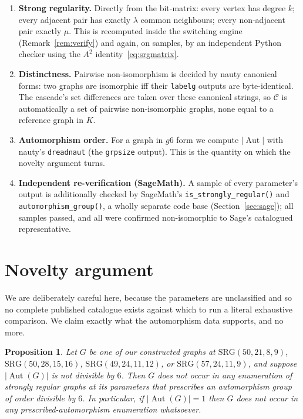 \documentclass[11pt]{article}
\newtheorem{proposition}{Proposition}
\theoremstyle{definition}
\newcommand{\SRG}[1]{\mathrm{SRG}(#1)}
\newcommand{\Aut}{\operatorname{Aut}}
\begin{document}
\begin{enumerate}
  \item \textbf{Strong regularity.} Directly from the bit-matrix: every vertex has degree
  $k$; every adjacent pair has exactly $\lambda$ common neighbours; every non-adjacent pair
  exactly $\mu$. This is recomputed inside the switching engine
  (Remark~\ref{rem:verify}) and again, on samples, by an independent Python checker using
  the $A^2$ identity~\eqref{eq:srgmatrix}.
  \item \textbf{Distinctness.} Pairwise non-isomorphism is decided by nauty canonical
  forms: two graphs are isomorphic iff their \texttt{labelg} outputs are byte-identical.
  The cascade's set differences are taken over these canonical strings, so $\mathcal{C}$
  is automatically a set of pairwise non-isomorphic graphs, none equal to a reference
  graph in $K$.
  \item \textbf{Automorphism order.} For a graph in $g6$ form we compute $|\Aut|$ with
  nauty's \texttt{dreadnaut} (the \texttt{grpsize} output). This is the quantity on which
  the novelty argument turns.
  \item \textbf{Independent re-verification (SageMath).} A sample of every parameter's
  output is additionally checked by SageMath's \verb|is_strongly_regular()| and
  \verb|automorphism_group()|, a wholly separate code base (Section~\ref{sec:sage}); all
  samples passed, and all were confirmed non-isomorphic to Sage's catalogued representative.
\end{enumerate}

\section{Novelty argument}\label{sec:novelty}

We are deliberately careful here, because the parameters are unclassified and so no
complete published catalogue exists against which to run a literal exhaustive comparison.
We claim exactly what the automorphism data supports, and no more.

\begin{proposition}\label{prop:outside}
Let $G$ be one of our constructed graphs at $\SRG{50,21,8,9}$, $\SRG{50,28,15,16}$,
$\SRG{49,24,11,12}$, or $\SRG{57,24,11,9}$, and suppose $|\Aut(G)|$ is not divisible by $6$. Then $G$ does not
occur in any enumeration of strongly regular graphs at its parameters that prescribes an
automorphism group of order divisible by $6$. In particular, if $|\Aut(G)|=1$ then $G$
does not occur in \emph{any} prescribed-automorphism enumeration whatsoever.
\end{proposition}
\end{document}
